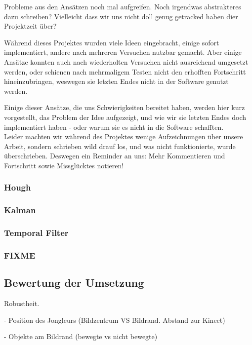 \documentclass[12pt,a4paper,ngerman]{scrartcl}
\begin{document}
{\color{red}Probleme aus den Ansätzen noch mal aufgreifen. Noch irgendwas abstrakteres dazu schreiben? Vielleicht dass wir uns nicht doll genug getracked haben dier Projektzeit über?}

Während dieses Projektes wurden viele Ideen eingebracht, einige sofort implementiert, andere nach mehreren Versuchen nutzbar gemacht. Aber einige Ansätze konnten auch nach wiederholten Versuchen nicht ausreichend umgesetzt werden, oder schienen nach mehrmaligem Testen nicht den erhofften Fortschritt hineinzubringen, weswegen sie letzten Endes nicht in der Software genutzt werden.

Einige dieser Ansätze, die uns Schwierigkeiten bereitet haben, werden hier kurz vorgestellt, das Problem der Idee aufgezeigt, und wie wir sie letzten Endes doch implementiert haben - oder warum sie es nicht in die Software schafften.\\
Leider machten wir während des Projektes wenige Aufzeichnungen über unsere Arbeit, sondern schrieben wild drauf los, und was nicht funktionierte, wurde überschrieben. Deswegen ein Reminder an uns: Mehr Kommentieren und Fortschritt sowie Missglücktes notieren!

\subsubsection{Hough}

\subsubsection{Kalman}

\subsubsection{Temporal Filter}

\subsubsection{FIXME}

\subsection{Bewertung der Umsetzung}

Robustheit.

  - Position des Jongleurs (Bildzentrum VS Bildrand. Abstand zur Kinect)
  
  - Objekte am Bildrand (bewegte vs nicht bewegte)
  
\end{document}
